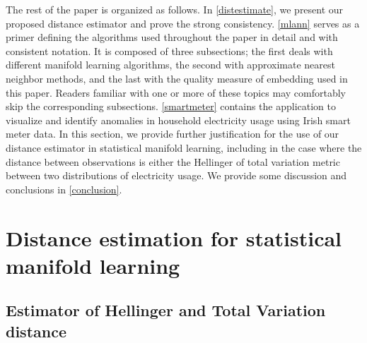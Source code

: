 \documentclass{article}
\begin{document}
The rest of the paper is organized as follows. In
\autoref{distestimate}, we present our proposed distance estimator and
prove the strong consistency. \autoref{mlann} serves as a primer
defining the algorithms used throughout the paper in detail and with
consistent notation. It is composed of three subsections; the first
deals with different manifold learning algorithms, the second with
approximate nearest neighbor methods, and the last with the quality
measure of embedding used in this paper. Readers familiar with one or
more of these topics may comfortably skip the corresponding subsections.
\autoref{smartmeter} contains the application to visualize and identify
anomalies in household electricity usage using Irish smart meter data.
In this section, we provide further justification for the use of our
distance estimator in statistical manifold learning, including in the
case where the distance between observations is either the Hellinger of
total variation metric between two distributions of electricity usage.
We provide some discussion and conclusions in \autoref{conclusion}.

\hypertarget{distestimate}{%
\section{Distance estimation for statistical manifold
learning}\label{distestimate}}

\hypertarget{estimator}{%
\subsection{Estimator of Hellinger and Total Variation
distance}\label{estimator}}
\end{document}
